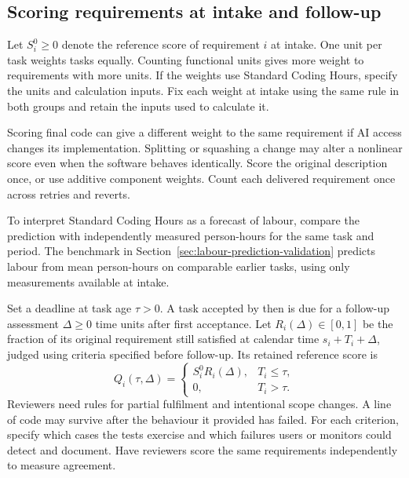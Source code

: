 \documentclass[11pt,a4paper]{amsart}
\begin{document}
\subsection{Scoring requirements at intake and follow-up}

Let $S_i^0\geq0$ denote the reference score of requirement $i$ at intake. One unit per task weights tasks equally. Counting functional units gives more weight to requirements with more units. If the weights use Standard Coding Hours, specify the units and calculation inputs. Fix each weight at intake using the same rule in both groups and retain the inputs used to calculate it.

Scoring final code can give a different weight to the same requirement if AI access changes its implementation. Splitting or squashing a change may alter a nonlinear score even when the software behaves identically. Score the original description once, or use additive component weights. Count each delivered requirement once across retries and reverts.

To interpret Standard Coding Hours as a forecast of labour, compare the prediction with independently measured person-hours for the same task and period. The benchmark in Section~\ref{sec:labour-prediction-validation} predicts labour from mean person-hours on comparable earlier tasks, using only measurements available at intake.

Set a deadline at task age $\tau>0$. A task accepted by then is due for a follow-up assessment $\Delta\geq0$ time units after first acceptance. Let $R_i(\Delta)\in[0,1]$ be the fraction of its original requirement still satisfied at calendar time $s_i+T_i+\Delta$, judged using criteria specified before follow-up. Its retained reference score is
\begin{equation}
\label{eq:retention}
 Q_i(\tau,\Delta)=\begin{cases} S_i^0 R_i(\Delta),&T_i\leq\tau,\\ 0,&T_i>\tau.\end{cases}
\end{equation}
Reviewers need rules for partial fulfilment and intentional scope changes. A line of code may survive after the behaviour it provided has failed. For each criterion, specify which cases the tests exercise and which failures users or monitors could detect and document. Have reviewers score the same requirements independently to measure agreement.


\end{document}
